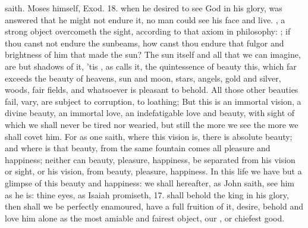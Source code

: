 {saith. Moses himself, Exod.  18. when he desired to see God in
his glory, was answered that he might not endure it, no man could see
his face and live. , a strong object
overcometh the sight, according to that axiom in philosophy: ; if thou canst not endure
the sunbeams, how canst thou endure that fulgor and brightness of him
that made the sun? The sun itself and all that we can imagine, are but
shadows of it, 'tis , as \Austin{} calls it, the
quintessence of beauty this, which far exceeds the beauty of heavens,
sun and moon, stars, angels, gold and silver, woods, fair fields, and
whatsoever is pleasant to behold. All those other beauties fail, vary,
are subject to corruption, to loathing; But this is an immortal
vision, a divine beauty, an immortal love, an indefatigable love and
beauty, with sight of which we shall never be tired nor wearied, but
still the more we see the more we shall covet him. For as one
saith, where this vision is, there is absolute beauty; and where is
that beauty, from the same fountain comes all pleasure and happiness;
neither can beauty, pleasure, happiness, be separated from his vision
or sight, or his vision, from beauty, pleasure, happiness. In this life
we have but a glimpse of this beauty and happiness: we shall hereafter,
as John saith, see him as he is: thine eyes, as Isaiah promiseth,
 17. shall behold the king in his glory, then shall we be
perfectly enamoured, have a full fruition of it, desire, behold
and love him alone as the most amiable and fairest object, our , or chiefest good.

}
